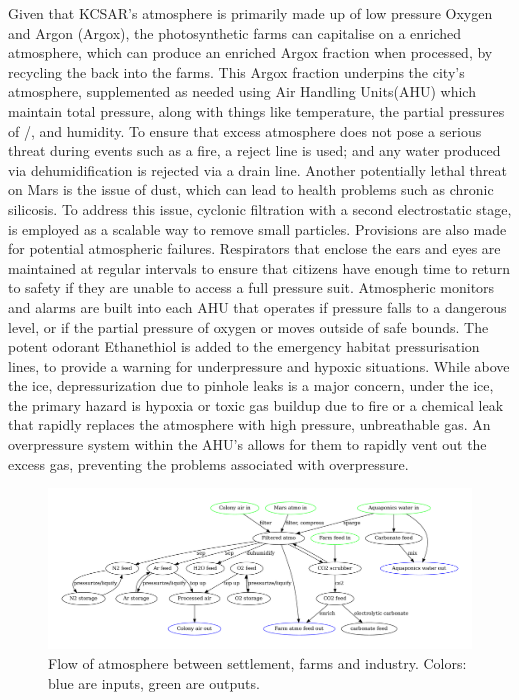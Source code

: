 \documentclass[fleqn,10pt]{Stylesheet} %
\begin{document}
Given that KCSAR’s atmosphere is primarily made up of low pressure Oxygen and Argon (Argox), the photosynthetic farms can capitalise on a  enriched atmosphere, which can produce an enriched Argox fraction when processed, by recycling the  back into the farms. This  Argox fraction underpins  the city’s atmosphere, supplemented as needed using Air Handling Units(AHU) which maintain total pressure, along with things like temperature, the partial pressures of /, and humidity. To ensure that excess atmosphere does not pose a serious threat during events such as a fire, a reject line is used; and any water produced via dehumidification is rejected via a drain line. Another potentially lethal threat on Mars is the issue of dust, which can lead to health problems such as chronic silicosis. To address this issue, cyclonic filtration with a second electrostatic stage, is employed as a scalable way to remove small particles. Provisions are also made for potential atmospheric failures. Respirators that enclose the ears and eyes are maintained at regular intervals to ensure that citizens have enough time to return to safety if they are unable to access a full pressure suit. Atmospheric monitors and alarms are built into each AHU that operates if pressure falls to a dangerous level, or if the partial pressure of oxygen or  moves outside of safe bounds. The potent odorant Ethanethiol is added to the emergency habitat pressurisation lines, to provide a warning for underpressure and hypoxic situations. While above the ice, depressurization due to pinhole leaks is a major concern, under the ice, the primary hazard is hypoxia or toxic gas buildup due to fire or a chemical leak that rapidly replaces the atmosphere with high pressure, unbreathable gas. An overpressure system within the AHU’s allows for them to rapidly vent out the excess gas, preventing the problems associated with overpressure.

\begin{figure}
    \centering
    \includegraphics[width=\linewidth]{figures/fig_atmo.pdf}
    \caption{Flow of atmosphere between settlement, farms and industry. Colors: blue are inputs, green are outputs.}
    \label{fig:atmo_diagram}
\end{figure}
\end{document}
